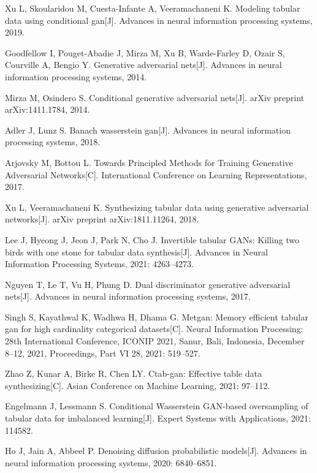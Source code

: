 \begin{thebibliography}{200}
	Xu L, Skoularidou M, Cuesta-Infante A, Veeramachaneni K. Modeling tabular data using conditional gan[J]. Advances in neural information processing systems, 2019.
	
	Goodfellow I, Pouget-Abadie J, Mirza M, Xu B, Warde-Farley D, Ozair S, Courville A, Bengio Y. Generative adversarial nets[J]. Advances in neural information processing systems, 2014.
	
	Mirza M, Osindero S. Conditional generative adversarial nets[J]. arXiv preprint arXiv:1411.1784, 2014.
	
	Adler J, Lunz S. Banach wasserstein gan[J]. Advances in neural information processing systems, 2018.
	
	Arjovsky M, Bottou L. Towards Principled Methods for Training Generative Adversarial Networks[C]. International Conference on Learning Representations, 2017.
	
	Xu L, Veeramachaneni K. Synthesizing tabular data using generative adversarial networks[J]. arXiv preprint arXiv:1811.11264, 2018.
	
	Lee J, Hyeong J, Jeon J, Park N, Cho J. Invertible tabular GANs: Killing two birds with one stone for tabular data synthesis[J]. Advances in Neural Information Processing Systems, 2021: 4263--4273.
	
	Nguyen T, Le T, Vu H, Phung D. Dual discriminator generative adversarial nets[J]. Advances in neural information processing systems, 2017.
	
	Singh S, Kayathwal K, Wadhwa H, Dhama G. Metgan: Memory efficient tabular gan for high cardinality categorical datasets[C]. Neural Information Processing: 28th International Conference, ICONIP 2021, Sanur, Bali, Indonesia, December 8--12, 2021, Proceedings, Part VI 28, 2021: 519--527.
	
	Zhao Z, Kunar A, Birke R, Chen LY. Ctab-gan: Effective table data synthesizing[C]. Asian Conference on Machine Learning, 2021: 97--112.
	
	Engelmann J, Lessmann S. Conditional Wasserstein GAN-based oversampling of tabular data for imbalanced learning[J]. Expert Systems with Applications, 2021: 114582.
	
	Ho J, Jain A, Abbeel P. Denoising diffusion probabilistic models[J]. Advances in neural information processing systems, 2020: 6840--6851.
	

\end{thebibliography}
